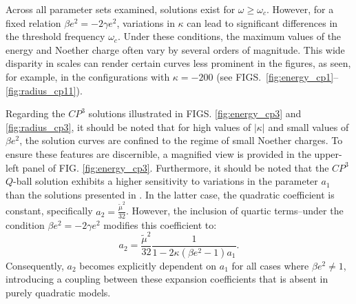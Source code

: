 \documentclass[aps,prd,superscriptaddress,notitlepage,11pt,final,longbibliography,nofootinbib]{revtex4-1}
\numberwithin{equation}{section}
\begin{document}
Across all parameter sets examined, solutions exist for $\omega \geq \omega_c$. However, for a fixed relation $\beta e^2 = -2\gamma e^2$, variations in $\kappa$ can lead to significant differences in the threshold frequency $\omega_c$. Under these conditions, the maximum values of the energy and Noether charge often vary by several orders of magnitude. This wide disparity in scales can render certain curves less prominent in the figures, as seen, for example, in the configurations with $\kappa = -200$ (see FIGS.~\ref{fig:energy_cp1}--\ref{fig:radius_cp11}).


Regarding the $CP^3$ solutions illustrated in FIGS. \ref{fig:energy_cp3} and \ref{fig:radius_cp3}, it should be noted that for high values of $|\kappa|$ and small values of $\beta e^2$, the solution curves are confined to the regime of small Noether charges. To ensure these features are discernible, a magnified view is provided in the upper-left panel of FIG. \ref{fig:energy_cp3}. Furthermore, it should be noted that the $CP^3$ $Q$-ball solution exhibits a higher sensitivity to variations in the parameter $a_1$ than the solutions presented in \cite{Klimas:2017eft}. In the latter case, the quadratic coefficient is constant, specifically $a_2 = \frac{\widetilde \mu^2}{32}$. However, the inclusion of quartic terms--under the condition $\beta e^2 = -2\gamma e^2$ modifies this coefficient to:
\[
a_2 = \frac{\widetilde \mu^2}{32} \frac{1}{1 - 2\kappa (\beta e^2 - 1) a_1}.
\]
Consequently, $a_2$ becomes explicitly dependent on $a_1$ for all cases where $\beta e^2 \neq 1$, introducing a coupling between these expansion coefficients that is absent in purely quadratic models.
\end{document}
